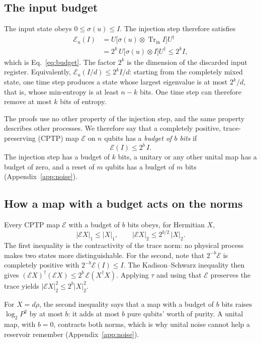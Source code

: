 \documentclass[aps,pra,reprint,superscriptaddress,floatfix]{revtex4-2}
\theoremstyle{plain}
\newcommand{\tr}{\operatorname{Tr}}
\newcommand{\nrm}[2]{\lvert #1\rvert_{#2}}
\newcommand{\cE}{\mathcal E}
\begin{document}
\subsection{The input budget}

The input state obeys $0\le\sigma(u)\le I$. The injection step therefore satisfies
\begin{align}
\cE_u(I)&=U\bigl[\sigma(u)\otimes\tr_{\mathrm{in}}I\bigr]U^\dagger\nonumber\\
&=2^k\,U\bigl[\sigma(u)\otimes I\bigr]U^\dagger\le2^k I,
\end{align}
which is Eq.~\eqref{eq:budget}. The factor $2^k$ is the dimension of the discarded input register. Equivalently, $\cE_u(I/d)\le2^kI/d$: starting from the completely mixed state, one time step produces a state whose largest eigenvalue is at most $2^k/d$, that is, whose min-entropy is at least $n-k$ bits. One time step can therefore remove at most $k$ bits of entropy.

The proofs use no other property of the injection step, and the same property describes other processes. We therefore say that a completely positive, trace-preserving (CPTP) map $\cE$ on $n$ qubits has a \emph{budget of $b$ bits} if
\begin{equation}
\cE(I)\le2^b\,I .
\label{eq:A-budgetdef}
\end{equation}
The injection step has a budget of $k$ bits, a unitary or any other unital map has a budget of zero, and a reset of $m$ qubits has a budget of $m$ bits (Appendix~\ref{app:noise}).

\subsection{How a map with a budget acts on the norms}

Every CPTP map $\cE$ with a budget of $b$ bits obeys, for Hermitian $X$,
\begin{equation}
\nrm{\cE X}1\le\nrm X1,\qquad\nrm{\cE X}2\le2^{b/2}\,\nrm X2 .
\label{eq:A-norms}
\end{equation}
The first inequality is the contractivity of the trace norm: no physical process makes two states more distinguishable. For the second, note that $2^{-b}\cE$ is completely positive with $2^{-b}\cE(I)\le I$. The Kadison--Schwarz inequality then gives $(\cE X)^\dagger(\cE X)\le2^b\,\cE(X^\dagger X)$. Applying $\tau$ and using that $\cE$ preserves the trace yields $\nrm{\cE X}2^2\le2^b\nrm X2^2$.

For $X=d\rho$, the second inequality says that a map with a budget of $b$ bits raises $\log_2P^2$ by at most $b$: it adds at most $b$ pure qubits' worth of purity. A unital map, with $b=0$, contracts both norms, which is why unital noise cannot help a reservoir remember (Appendix~\ref{app:noise}).
\end{document}
